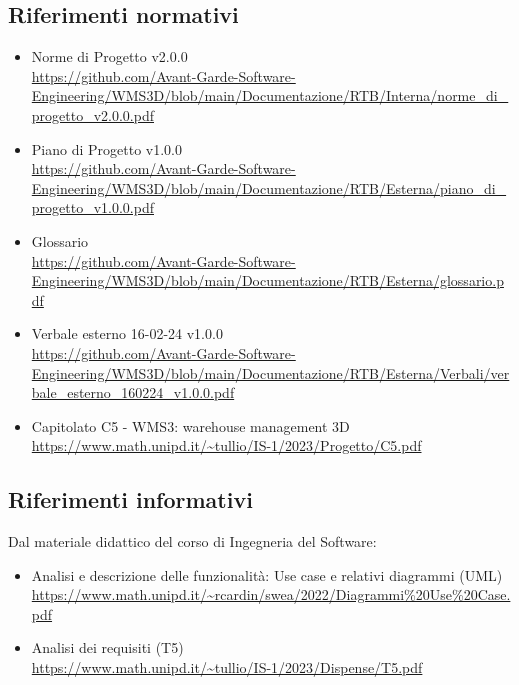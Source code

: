 \subsection{Riferimenti normativi}\label{sec:riferimenti_normativi}
\begin{itemize}
    \item Norme di Progetto v2.0.0 \\
    \url{https://github.com/Avant-Garde-Software-Engineering/WMS3D/blob/main/Documentazione/RTB/Interna/norme_di_progetto_v2.0.0.pdf}
    \item Piano di Progetto v1.0.0 \\
    \url{https://github.com/Avant-Garde-Software-Engineering/WMS3D/blob/main/Documentazione/RTB/Esterna/piano_di_progetto_v1.0.0.pdf}
    \item Glossario \\
    \url{https://github.com/Avant-Garde-Software-Engineering/WMS3D/blob/main/Documentazione/RTB/Esterna/glossario.pdf}
    \item Verbale esterno 16-02-24 v1.0.0 \\
    \url{https://github.com/Avant-Garde-Software-Engineering/WMS3D/blob/main/Documentazione/RTB/Esterna/Verbali/verbale_esterno_160224_v1.0.0.pdf}
    \item Capitolato C5 - WMS3: warehouse management 3D \\
    \url{https://www.math.unipd.it/~tullio/IS-1/2023/Progetto/C5.pdf}
\end{itemize}

\subsection{Riferimenti informativi}\label{sec:riferimenti_informativi}
Dal materiale didattico del corso di Ingegneria del Software:
\begin{itemize}
    \item Analisi e descrizione delle funzionalità: Use case e relativi diagrammi (UML) \\
    \url{https://www.math.unipd.it/~rcardin/swea/2022/Diagrammi%20Use%20Case.pdf}
    \item Analisi dei requisiti (T5) \\
    \url{https://www.math.unipd.it/~tullio/IS-1/2023/Dispense/T5.pdf}
\end{itemize}
